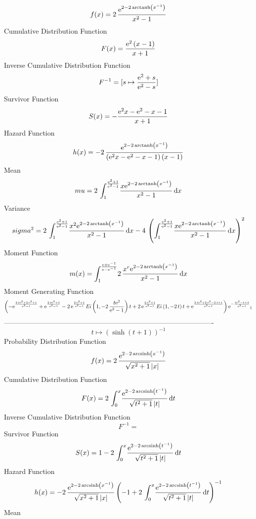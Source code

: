 \documentclass[12pt]{article}
\begin{document}
$$  f(x)=2\,{\frac {{{\rm e}^{2-2\,{\rm arctanh} \left({x}^{-1}\right)}}}{{x}^{
2}-1}}
$$Cumulative Distribution Function  
 $$F(x)={\frac {{{\rm e}^{2}} \left( x-1 \right) }{x+1}}
$$ Inverse Cumulative Distribution Function 
  $$F^{-1} = [s\mapsto {\frac {{{\rm e}^{2}}+s}{{{\rm e}^{2}}-s}}]
$$Survivor Function 
 $$ S(x)=-{\frac {{{\rm e}^{2}}x-{{\rm e}^{2}}-x-1}{x+1}}
$$ Hazard Function 
 $$ h(x)=-2\,{\frac {{{\rm e}^{2-2\,{\rm arctanh} \left({x}^{-1}\right)}}}{
 \left( {{\rm e}^{2}}x-{{\rm e}^{2}}-x-1 \right)  \left( x-1 \right) }
}
$$Mean 
 $$ mu=2\,\int_{1}^{{\frac {{{\rm e}^{2}}+1}{{{\rm e}^{2}}-1}}}\!{\frac {x{
{\rm e}^{2-2\,{\rm arctanh} \left({x}^{-1}\right)}}}{{x}^{2}-1}}
\,{\rm d}x
$$ Variance 
 $$ sigma^2 = 2\,\int_{1}^{{\frac {{{\rm e}^{2}}+1}{{{\rm e}^{2}}-1}}}\!{\frac {{x}^
{2}{{\rm e}^{2-2\,{\rm arctanh} \left({x}^{-1}\right)}}}{{x}^{2}-1}}
\,{\rm d}x-4\, \left( \int_{1}^{{\frac {{{\rm e}^{2}}+1}{{{\rm e}^{2}}
-1}}}\!{\frac {x{{\rm e}^{2-2\,{\rm arctanh} \left({x}^{-1}\right)}}}{
{x}^{2}-1}}\,{\rm d}x \right) ^{2}
$$Moment Function 
 $$ m(x) = \int_{1}^{{\frac {{\rm e}+{{\rm e}^{-1}}}{{\rm e}-{{\rm e}^{-1}}}}}\!2
\,{\frac {{x}^{r}{{\rm e}^{2-2\,{\rm arctanh} \left({x}^{-1}\right)}}
}{{x}^{2}-1}}\,{\rm d}x
$$ Moment Generating Function 
 $$ \left( -{{\rm e}^{{\frac {2\,t{{\rm e}^{2}}+2\,{{\rm e}^{2}}+1}{{
{\rm e}^{2}}-1}}}}+{{\rm e}^{{\frac {2\,t{{\rm e}^{2}}+3}{{{\rm e}^{2}
}-1}}}}-2\,{{\rm e}^{{\frac {2\,{{\rm e}^{2}}+1}{{{\rm e}^{2}}-1}}}}{
\it Ei} \left( 1,-2\,{\frac {t{{\rm e}^{2}}}{{{\rm e}^{2}}-1}}
 \right) t+2\,{{\rm e}^{{\frac {2\,{{\rm e}^{2}}+1}{{{\rm e}^{2}}-1}}}
}{\it Ei} \left( 1,-2\,t \right) t+{{\rm e}^{{\frac {2\,t{{\rm e}^{2}}
+2\,{{\rm e}^{2}}-2\,t+1}{{{\rm e}^{2}}-1}}}} \right) {{\rm e}^{-{
\frac {t{{\rm e}^{2}}-t+3}{{{\rm e}^{2}}-1}}}}_{{1}}
$$-------------------------------------------------------------------------------------------  \\$$t\mapsto  \left( \sinh \left( t+1 \right)  \right) ^{-1}
$$Probability Distribution Function 
$$  f(x)=2\,{\frac {{{\rm e}^{2-2\,{\rm arcsinh} \left({x}^{-1}\right)}}}{
\sqrt {{x}^{2}+1} \left| x \right| }}
$$Cumulative Distribution Function  
 $$F(x)=2\,\int_{0}^{x}\!{\frac {{{\rm e}^{2-2\,{\rm arcsinh} \left({t}^{-1}
\right)}}}{\sqrt {{t}^{2}+1} \left| t \right| }}\,{\rm d}t
$$ Inverse Cumulative Distribution Function 
  $$F^{-1} = $$Survivor Function 
 $$ S(x)=1-2\,\int_{0}^{x}\!{\frac {{{\rm e}^{2-2\,{\rm arcsinh} \left({t}^{-1}
\right)}}}{\sqrt {{t}^{2}+1} \left| t \right| }}\,{\rm d}t
$$ Hazard Function 
 $$ h(x)=-2\,{\frac {{{\rm e}^{2-2\,{\rm arcsinh} \left({x}^{-1}\right)}}}{
\sqrt {{x}^{2}+1} \left| x \right| } \left( -1+2\,\int_{0}^{x}\!{
\frac {{{\rm e}^{2-2\,{\rm arcsinh} \left({t}^{-1}\right)}}}{\sqrt {{t
}^{2}+1} \left| t \right| }}\,{\rm d}t \right) ^{-1}}
$$Mean 
\end{document}
